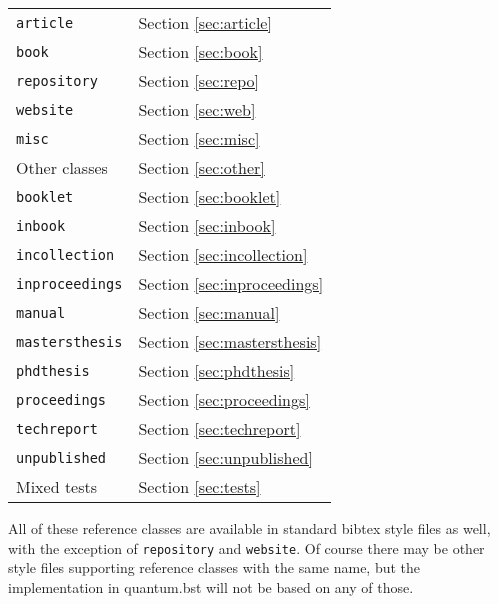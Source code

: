 \documentclass[a4paper,twocolumn,11pt]{quantumarticle}
\begin{document}
\begin{center}
\begin{tabular}{ll}
    \texttt{article} & Section \ref{sec:article}\\
    \texttt{book} & Section \ref{sec:book}\\
    \texttt{repository} & Section \ref{sec:repo}\\
    \texttt{website} & Section \ref{sec:web}\\
    \texttt{misc} & Section \ref{sec:misc}\\
    Other classes & Section \ref{sec:other}\\
    \hspace{0.8cm}\texttt{booklet} & Section \ref{sec:booklet}\\
    \hspace{0.8cm}\texttt{inbook} & Section \ref{sec:inbook}\\
    \hspace{0.8cm}\texttt{incollection} & Section \ref{sec:incollection}\\
    \hspace{0.8cm}\texttt{inproceedings} & Section \ref{sec:inproceedings}\\
    \hspace{0.8cm}\texttt{manual} & Section \ref{sec:manual}\\
    \hspace{0.8cm}\texttt{mastersthesis} & Section \ref{sec:mastersthesis}\\
    \hspace{0.8cm}\texttt{phdthesis} & Section \ref{sec:phdthesis}\\
    \hspace{0.8cm}\texttt{proceedings} & Section \ref{sec:proceedings}\\
    \hspace{0.8cm}\texttt{techreport} & Section \ref{sec:techreport}\\
    \hspace{0.8cm}\texttt{unpublished} & Section \ref{sec:unpublished}\\
    Mixed tests & Section \ref{sec:tests}\\
\end{tabular}
\end{center}

All of these reference classes are available in standard bibtex style files as well, with the exception of \texttt{repository} and \texttt{website}.
Of course there may be other style files supporting reference classes with the same name, but the implementation in quantum.bst will not be based on any of those.
\end{document}
